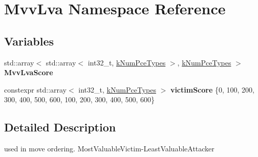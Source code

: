 \hypertarget{namespaceMvvLva}{}\section{Mvv\+Lva Namespace Reference}
\label{namespaceMvvLva}
\subsection*{Variables}
\begin{DoxyCompactItemize}
\item 
\mbox{\label{namespaceMvvLva_a105cf120f19fbd3d0e7820521aaadf0c}} 
std\+::array$<$ std\+::array$<$ int32\+\_\+t, \mbox{\hyperlink{constants_8h_a65fd654c96b3bb6b2e3f2e5c2d5bb09c}{k\+Num\+Pce\+Types}} $>$, \mbox{\hyperlink{constants_8h_a65fd654c96b3bb6b2e3f2e5c2d5bb09c}{k\+Num\+Pce\+Types}} $>$ {\bfseries Mvv\+Lva\+Score}
\item 
\mbox{\label{namespaceMvvLva_aa69f18e6e9edabdc70086bd7e3fe7c46}} 
constexpr std\+::array$<$ int32\+\_\+t, \mbox{\hyperlink{constants_8h_a65fd654c96b3bb6b2e3f2e5c2d5bb09c}{k\+Num\+Pce\+Types}} $>$ {\bfseries victim\+Score} \{0, 100, 200, 300, 400, 500, 600, 100, 200, 300, 400, 500, 600\}
\end{DoxyCompactItemize}


\subsection{Detailed Description}
used in move ordering. Most\+Valuable\+Victim-\/\+Least\+Valuable\+Attacker 